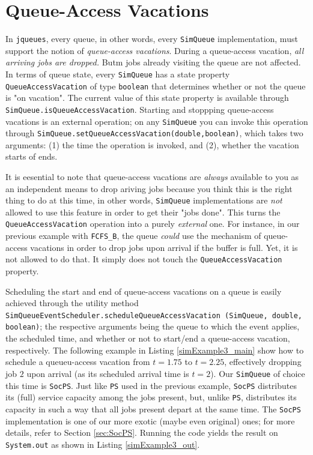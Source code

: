 \documentclass[12pt]{book}
\begin{document}
\section{Queue-Access Vacations}
\label{sec:guided:qav}

In \lstinline|jqueues|, every queue,
  in other words, every \lstinline|SimQueue| implementation,
  must support the notion of {\em queue-access vacations}.
During a queue-access vacation,
  {\em all arriving jobs are dropped.}
Butm jobs already visiting the queue are not affected.
In terms of queue state,
  every \lstinline|SimQueue| has a state
  property \lstinline|QueueAccessVacation|
  of type \lstinline|boolean|
  that determines whether or not the
  queue is "on vacation".
The current value of this state property is available through
  \lstinline{SimQueue.isQueueAccessVacation}.
Starting and stoppping queue-access vacations
  is an external operation;
  on any \lstinline{SimQueue} you can
  invoke this operation
  through \lstinline{SimQueue.setQueueAccessVacation(double,boolean)},
  which takes two arguments: (1) the time the operation is invoked,
  and (2), whether the vacation starts of ends.

It is eesential to note that queue-access vacations
  are {\em always\/} available to you
  as an independent means to drop ariving jobs
  because you think this is the right thing to do at this time,
  in other words,
  \lstinline|SimQueue| implementations
  are {\em not\/} allowed to use this feature
  in order to get their "jobs done".
This turns the \lstinline|QueueAccessVacation|
  operation into a purely {\em external\/} one.
For instance,
  in our previous example with \lstinline|FCFS_B|,
  the queue {\em could\/} use the mechanism
  of queue-access vacations in order to
  drop jobs upon arrival if the buffer is full.
Yet, it is not allowed to do that.
It simply does not touch the \lstinline|QueueAccessVacation| property.

Scheduling the start and end of queue-access vacations on a queue
  is easily achieved through the utility method
  \lstinline|SimQueueEventScheduler.scheduleQueueAccessVacation (SimQueue, double, boolean)|;
  the respective arguments being the queue to which the event applies,
  the scheduled time,
  and whether or not to start/end a queue-access vacation,
  respectively.
The following example in Listing \ref{simExample3_main}
  show how to schedule a queueu-access vacation from
  $t=1.75$ to $t=2.25$, effectively dropping job $2$
  upon arrival (as its scheduled arrival time is $t=2$).
Our \lstinline|SimQueue| of choice this time is \lstinline|SocPS|.
Just like \lstinline|PS| used in the previous example,
  \lstinline|SocPS| distributes its (full) service capacity
  among the jobs present,
  but, unlike \lstinline|PS|,
  distributes its capacity in such a way that all
  jobs present depart at the same time.
The \lstinline|SocPS| implementation
  is one of our more exotic (maybe even original) ones;
  for more details,
  refer to Section \ref{sec:SocPS}.
Running the code yields the result on \lstinline|System.out|
  as shown in Listing \ref{simExample3_out}.
\end{document}
